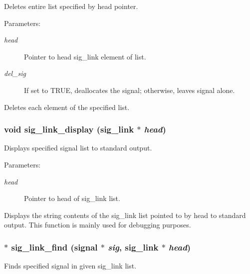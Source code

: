 Deletes entire list specified by head pointer. 

\begin{Desc}
\item[Parameters:]
\begin{description}
\item[{\em head}]Pointer to head sig\_\-link element of list. \item[{\em del\_\-sig}]If set to TRUE, deallocates the signal; otherwise, leaves signal alone.\end{description}
\end{Desc}
Deletes each element of the specified list. 
\subsubsection{\setlength{\rightskip}{0pt plus 5cm}void sig\_\-link\_\-display ({\bf sig\_\-link} $\ast$ {\em head})}\label{link_8c_a9}


Displays specified signal list to standard output. 

\begin{Desc}
\item[Parameters:]
\begin{description}
\item[{\em head}]Pointer to head of sig\_\-link list.\end{description}
\end{Desc}
Displays the string contents of the sig\_\-link list pointed to by head to standard output. This function is mainly used for debugging purposes. 
\subsubsection{$\ast$ sig\_\-link\_\-find ({\bf signal} $\ast$ {\em sig}, {\bf sig\_\-link} $\ast$ {\em head})}\label{link_8c_a14}


Finds specified signal in given sig\_\-link list. 

